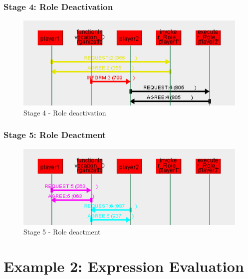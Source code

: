 \subsubsection*{Stage 4: Role Deactivation}

\begin{figure}[H]
	\centering
	\includegraphics[width=\textwidth]{images/example1-stage4.png}
	\caption{Stage 4 - Role deactivation}
	\label{figure:example1-stage4}
\end{figure}

\subsubsection*{Stage 5: Role Deactment}

\begin{figure}[H]
	\centering
	\includegraphics[width=\textwidth]{images/example1-stage5.png}
	\caption{Stage 5 - Role deactment}
	\label{figure:example1-stage5}
\end{figure} 

\section{Example 2: Expression Evaluation}


